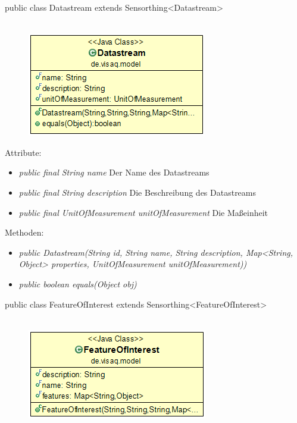 public class Datastream extends Sensorthing<Datastream>
\\\\
\begin{minipage}{0.3\textwidth}
	\begin{figure}[H]
		\includegraphics[scale = 0.5
		]{media/frontend/model/DatastreamClass.png}
	\end{figure}
\end{minipage} \hfill
\begin{minipage}{0.6\textwidth}
\end{minipage}

Attribute:
\begin{itemize} 
	\item \emph{public final String name} Der Name des Datastreams
	\item \emph{public final String description} Die Beschreibung des Datastreams
	\item \emph{public final UnitOfMeasurement unitOfMeasurement} Die Maßeinheit
\end{itemize}
Methoden:
\begin{itemize} 
	\item \emph{public Datastream(String id, String name, String description, Map<String, Object> properties, UnitOfMeasurement unitOfMeasurement))} 
	\item \emph{public boolean equals(Object obj)} 
\end{itemize}


public class FeatureOfInterest extends Sensorthing<FeatureOfInterest>
\\\\
\begin{minipage}{0.3\textwidth}
	\begin{figure}[H]
		\includegraphics[scale = 0.5
		]{media/frontend/model/FeatureOfInterestClass.png}
	\end{figure}
\end{minipage} \hfill
\begin{minipage}{0.6\textwidth}
\end{minipage}

